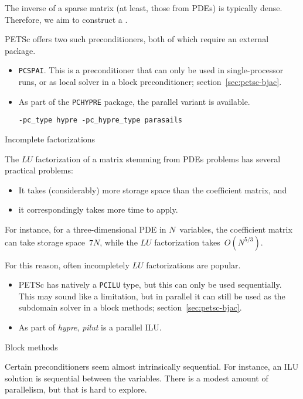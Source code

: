 The inverse of a sparse matrix (at least, those from \acp{PDE}) is typically dense.
Therefore, we aim to construct a .

PETSc offers two such preconditioners, both of which require an external package.
\begin{itemize}
\item \lstinline{PCSPAI}. This is a preconditioner that can only be
  used in single-processor runs, or as local solver in a block
  preconditioner; section~\ref{sec:petsc-bjac}.
\item As part of the \lstinline{PCHYPRE} package, the parallel variant
   is available.
\begin{verbatim}
-pc_type hypre -pc_hypre_type parasails
\end{verbatim}
\end{itemize}

 {Incomplete factorizations}

The $LU$ factorization of a matrix stemming from \acp{PDE} problems
has several practical problems:
\begin{itemize}
\item It takes (considerably) more storage space than the coefficient matrix, and
\item it correspondingly takes more time to apply.
\end{itemize}
For instance, for a three-dimensional \ac{PDE} in $N$~variables, the coefficient matrix
can take storage space~$7N$, while the $LU$ factorization takes~$O(N^{5/3})$.

For this reason, often incompletely $LU$ factorizations are popular.
\begin{itemize}
\item PETSc has natively a \lstinline{PCILU} type, but this can only be used sequentially.
  This may sound like a limitation, but in parallel it can still be used as the
  subdomain solver in a block methods; section~\ref{sec:petsc-bjac}.
\item As part of \emph{hypre}, \emph{pilut} is a parallel ILU.
\end{itemize}

 {Block methods}
\label{sec:petsc-bjac}

Certain preconditioners seem almost intrinsically sequential.
For instance, an ILU solution is sequential between the variables.
There is a modest amount of parallelism, but that is hard to explore.

